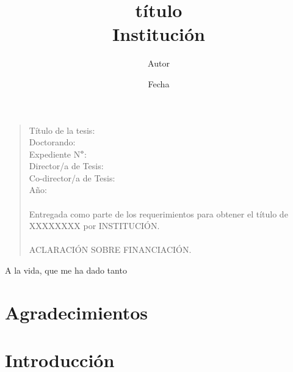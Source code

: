 \documentclass[a4paper, 12pt, twoside]{report} %
\title{
	{título} \\
	{\large Institución}
}
\author{Autor}
\date{Fecha}
\newenvironment{dedication}
  {\clearpage           %
   \thispagestyle{empty}%
   \vspace*{\stretch{1}}%
   \raggedleft          %
   
  }
  {\par %
   \vspace{\stretch{3}} %
   \clearpage           %
  }
\begin{document}

\maketitle %


\begin{quote}
Título de la tesis: \\
Doctorando: \\
Expediente N$\degree$: \\
Director/a de Tesis: \\
Co-director/a de Tesis: \\
Año: 
\\
\vspace{1cm}
\\
Entregada como parte de los requerimientos para obtener el título de XXXXXXXX por INSTITUCIÓN.
\\
\vspace{1cm}\\
ACLARACIÓN SOBRE FINANCIACIÓN.
\end{quote}

\begin{dedication}
A la vida, que me ha dado tanto
\end{dedication}

\tableofcontents %

%

\chapter*{Agradecimientos}


\thispagestyle{empty}


\newpage %
 

\chapter{Introducción}\label{doc-cap1}

\end{document}
